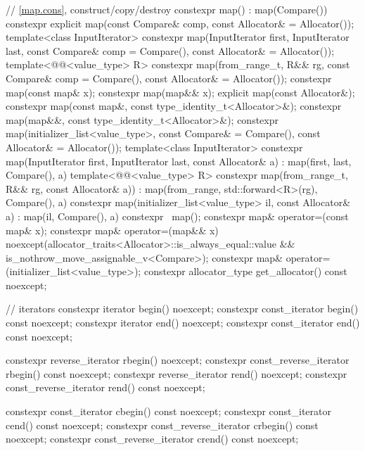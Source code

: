 \begin{codeblock}
{{    // \ref{map.cons}, construct/copy/destroy
    constexpr map() : map(Compare()) { }
    constexpr explicit map(const Compare& comp, const Allocator& = Allocator());
    template<class InputIterator>
      constexpr map(InputIterator first, InputIterator last,
                    const Compare& comp = Compare(), const Allocator& = Allocator());
    template<@@<value_type> R>
      constexpr map(from_range_t, R&& rg, const Compare& comp = Compare(),
                    const Allocator& = Allocator());
    constexpr map(const map& x);
    constexpr map(map&& x);
    explicit map(const Allocator&);
    constexpr map(const map&, const type_identity_t<Allocator>&);
    constexpr map(map&&, const type_identity_t<Allocator>&);
    constexpr map(initializer_list<value_type>, const Compare& = Compare(),
                  const Allocator& = Allocator());
    template<class InputIterator>
      constexpr map(InputIterator first, InputIterator last, const Allocator& a)
        : map(first, last, Compare(), a) { }
    template<@@<value_type> R>
      constexpr map(from_range_t, R&& rg, const Allocator& a))
        : map(from_range, std::forward<R>(rg), Compare(), a) { }
    constexpr map(initializer_list<value_type> il, const Allocator& a)
      : map(il, Compare(), a) { }
    constexpr ~map();
    constexpr map& operator=(const map& x);
    constexpr map& operator=(map&& x)
      noexcept(allocator_traits<Allocator>::is_always_equal::value &&
               is_nothrow_move_assignable_v<Compare>);
    constexpr map& operator=(initializer_list<value_type>);
    constexpr allocator_type get_allocator() const noexcept;

    // iterators
    constexpr iterator               begin() noexcept;
    constexpr const_iterator         begin() const noexcept;
    constexpr iterator               end() noexcept;
    constexpr const_iterator         end() const noexcept;

    constexpr reverse_iterator       rbegin() noexcept;
    constexpr const_reverse_iterator rbegin() const noexcept;
    constexpr reverse_iterator       rend() noexcept;
    constexpr const_reverse_iterator rend() const noexcept;

    constexpr const_iterator         cbegin() const noexcept;
    constexpr const_iterator         cend() const noexcept;
    constexpr const_reverse_iterator crbegin() const noexcept;
    constexpr const_reverse_iterator crend() const noexcept;

}}
\end{codeblock}
